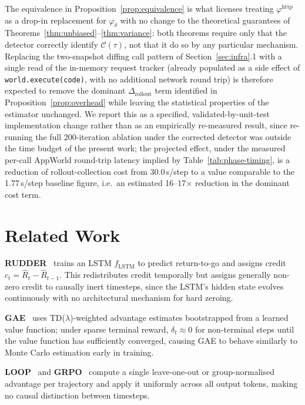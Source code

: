 \documentclass[11pt]{article}
\begin{document}
\noindent The equivalence in Proposition~\ref{prop:equivalence} is what
licenses treating $\varphi^{\mathrm{http}}$ as a drop-in replacement for
$\varphi_\delta$ with no change to the theoretical guarantees of
Theorems~\ref{thm:unbiased}--\ref{thm:variance}: both theorems require only
that the detector correctly identify $\mathcal{C}(\tau)$, not that it do so by
any particular mechanism. Replacing the two-snapshot diffing call pattern of
Section~\ref{sec:infra}.1 with a single read of the in-memory request tracker
(already populated as a side effect of \texttt{world.execute(code)}, with no
additional network round trip) is therefore expected to remove the dominant
$\Delta_{\mathrm{rollout}}$ term identified in
Proposition~\ref{prop:overhead} while leaving the statistical properties of
the estimator unchanged. We report this as a specified, validated-by-unit-test
implementation change rather than as an empirically re-measured result, since
re-running the full 200-iteration ablation under the corrected detector was
outside the time budget of the present work; the projected effect, under the
measured per-call AppWorld round-trip latency implied by
Table~\ref{tab:phase-timing}, is a reduction of rollout-collection cost from
30.0\,s/step to a value comparable to the 1.77\,s/step baseline figure, i.e.\
an estimated 16--17$\times$ reduction in the dominant cost term.

\section{Related Work}

\textbf{RUDDER}~\cite{rudder2019} trains an LSTM $f_{\mathrm{LSTM}}$ to predict
return-to-go and assigns credit $c_t = \hat{R}_t - \hat{R}_{t-1}$. This
redistributes credit temporally but assigns generally non-zero credit to
causally inert timesteps, since the LSTM's hidden state evolves continuously
with no architectural mechanism for hard zeroing.

\textbf{GAE}~\cite{schulman2016gae} uses TD($\lambda$)-weighted advantage
estimates bootstrapped from a learned value function; under sparse terminal
reward, $\delta_t \approx 0$ for non-terminal steps until the value function
has sufficiently converged, causing GAE to behave similarly to Monte Carlo
estimation early in training.

\textbf{LOOP}~\cite{loop2025} and \textbf{GRPO}~\cite{grpo2024} compute a
single leave-one-out or group-normalised advantage per trajectory and apply
it uniformly across all output tokens, making no causal distinction between
timesteps.
\end{document}
